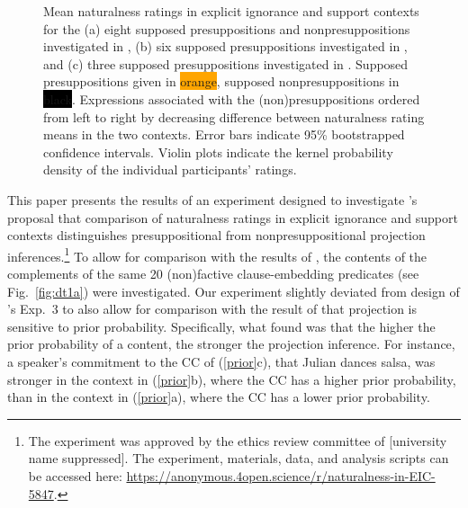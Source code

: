 \documentclass[11pt,fleqn]{article}
\newcommand{\6}{\mbox{$[\hspace*{-.6mm}[$}}
\newcommand{\9}{\mbox{$]\hspace*{-.6mm}]$}}
\newcommand{\citepos}[1]{\citeauthor{#1}'s \citeyear{#1}}
\begin{document}
\begin{figure}[h!]
\caption{Mean naturalness ratings in explicit ignorance and support contexts for the (a)  eight supposed presuppositions and nonpresuppositions investigated in \citealt[Exp.~3]{mandelkern-etal2020}, (b) six supposed presuppositions investigated in \citealt[Exp.~1]{kalomoiros-schwarz2024}, and (c) three supposed presuppositions investigated in \citealt[Exp.~2]{kalomoiros-schwarz2024}. Supposed presuppositions given in \colorbox{orange}{\color{white}orange\color{black}}, supposed nonpresuppositions in \colorbox{black}{\color{white}black\color{black}}. Expressions associated with the (non)presuppositions ordered from left to right by decreasing difference between naturalness rating means in the two contexts. Error bars indicate 95\% bootstrapped confidence intervals. Violin plots indicate the kernel probability density of the individual participants' ratings.}\label{fig:both-contexts}
\end{figure}

This paper presents the results of an experiment designed to investigate \citepos{mandelkern-etal2020} proposal that comparison of naturalness ratings in explicit ignorance and support contexts distinguishes presuppositional from nonpresuppositional projection inferences.\footnote{\label{f:github}The experiment was approved by the ethics review committee of [university name suppressed]. The experiment, materials, data, and analysis scripts can be accessed here:  \url{https://anonymous.4open.science/r/naturalness-in-EIC-5847}.}  To allow for comparison with the results of \citealt{degen-tonhauser-language}, the contents of the complements of the same 20 (non)factive clause-embedding predicates (see Fig.~\ref{fig:dt1a}) were investigated. Our experiment slightly deviated from design of \citepos{mandelkern-etal2020} Exp.~3  to also allow for comparison with the result of \citealt{degen-tonhauser-openmind} that projection is sensitive to prior probability. Specifically, what \citealt{degen-tonhauser-openmind} found was that the higher the prior probability of a content, the stronger the projection inference. For instance, a speaker's commitment to the CC of (\ref{prior}c), that Julian dances salsa, was stronger in the context in (\ref{prior}b), where the CC has a higher prior probability, than in the context in (\ref{prior}a), where the CC has a lower prior probability.
\end{document}
